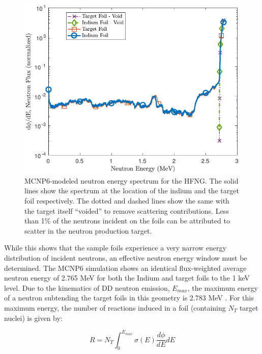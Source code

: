 \documentclass[5p]{elsarticle}
\newcommand{\comment}[1]{\todo[color=blue!20!white,inline]{ASV: #1}}
\begin{document}
\begin{figure}
 \centering
 \includegraphics[scale=0.6]{./figures/mcnp_flux_new.pdf}
 \caption{MCNP6-modeled neutron energy spectrum for the HFNG.  The solid lines show the spectrum at the location of the indium and the target foil respectively. The dotted and dashed lines show the same with the target itself \enquote{voided} to remove scattering contributions.  Less than 1\%  of the neutrons incident on the foils can be attributed to scatter in the neutron production target.}
 \label{fig:mcnp_flux}
\end{figure}





While this shows that the sample foils experience a very narrow energy distribution of incident neutrons, an effective neutron energy window must be determined.
The MCNP6 simulation shows an identical flux-weighted average neutron energy of 2.765 MeV for both the Indium and target foils to the 1 keV level.
Due to the kinematics of DD neutron emission, $E_{max}$,  the maximum energy of a neutron subtending the target foils in this geometry is 2.783 MeV \cite{Liskien_Paulsen_1973}.
For this maximum energy, the number of reactions induced in a foil (containing $N_T$ target nuclei) is given by:

\begin{equation}
R = N_T \int_0^{E_{max}} \sigma(E) \dfrac{d\phi}{dE} dE
\end{equation}
\end{document}
